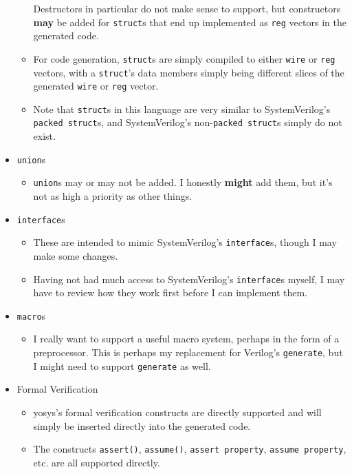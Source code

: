 \documentclass{article}
\begin{document}
\begin{itemize}
\begin{itemize}
			Destructors in particular do not make sense to support, but
			constructors \textbf{may} be added for \texttt{struct}s that
			end up implemented as \texttt{reg} vectors in the generated
			code.
			\item For code generation, \texttt{struct}s are simply compiled
			to either \texttt{wire} or \texttt{reg} vectors, with a
			\texttt{struct}'s data members simply being different slices of
			the generated \texttt{wire} or \texttt{reg} vector.
			\item Note that \texttt{struct}s in this language are very
			similar to SystemVerilog's \texttt{packed struct}s, and
			SystemVerilog's non-\texttt{packed struct}s simply do not
			exist.
			\end{itemize}
		\item \texttt{union}s
			\begin{itemize}
			\item \texttt{union}s may or may not be added.  I honestly
			\textbf{might} add them, but it's not as high a priority as
			other things.
			\end{itemize}
		\item \texttt{interface}s
			\begin{itemize}
			\item These are intended to mimic SystemVerilog's
			\texttt{interface}s, though I may make some changes.
			\item Having not had much access to SystemVerilog's
			\texttt{interface}s myself, I may have to review how they work
			first before I can implement them.
			\end{itemize}
		\item \texttt{macro}s
			\begin{itemize}
			\item I really want to support a useful macro system, perhaps
			in the form of a preprocessor.  This is perhaps my replacement
			for Verilog's \texttt{generate}, but I might need to support
			\texttt{generate} as well.
			\end{itemize}
		\item Formal Verification
			\begin{itemize}
			\item yosys's formal verification constructs are directly
			supported and will simply be inserted directly into the
			generated code.
			\item The constructs \texttt{assert()}, \texttt{assume()},
			\texttt{assert property}, \texttt{assume property}, etc. are
			all supported directly.
			\end{itemize}
		\end{itemize}
\end{document}
